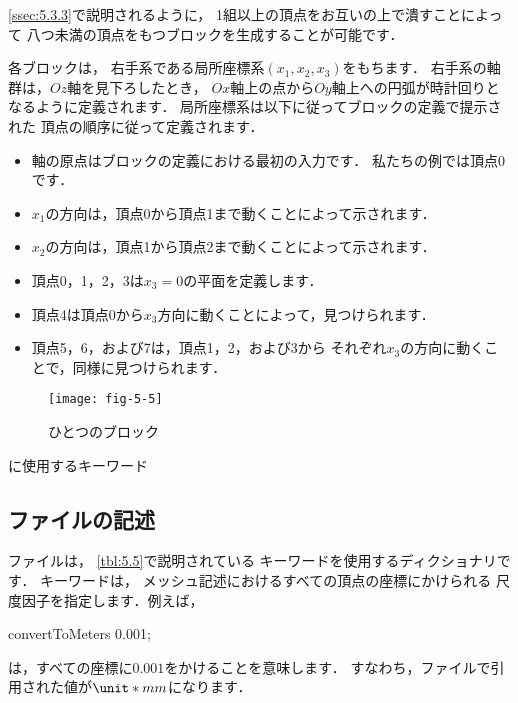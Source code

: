 \autoref{ssec:5.3.3}で説明されるように，
1組以上の頂点をお互いの上で潰すことによって
八つ未満の頂点をもつブロックを生成することが可能です．

各ブロックは，
右手系である局所座標系$(x_{1}, x_{2}, x_{3})$をもちます．
右手系の軸群は，$Oz$軸を見下ろしたとき，
$Ox$軸上の点から$Oy$軸上への円弧が時計回りとなるように定義されます．
局所座標系は以下に従ってブロックの定義で提示された
頂点の順序に従って定義されます．
\begin{itemize}
 \label{p:U-130}
 \item 軸の原点はブロックの定義における最初の入力です．
       私たちの例では頂点0です．
 \item $x_{1}$の方向は，頂点0から頂点1まで動くことによって示されます．
 \item $x_{2}$の方向は，頂点1から頂点2まで動くことによって示されます．
 \item 頂点0，1，2，3は$x_{3} = 0$の平面を定義します．
 \item 頂点4は頂点0から$x_{3}$方向に動くことによって，見つけられます．
 \item 頂点5，6，および7は，頂点1，2，および3から
       それぞれ$x_{3}$の方向に動くことで，同様に見つけられます．
\end{itemize}


\begin{figure}[ht]
 \texttt{[image: fig-5-5]}
 \caption{ひとつのブロック}
 \label{fig:5.5}
\end{figure}


\begin{table}[ht]
 
 \caption{に使用するキーワード}
 \label{tbl:5.5}
\end{table}


\subsection{ファイルの記述}
\label{ssec:5.3.1}
ファイルは，
\autoref{tbl:5.5}で説明されている
キーワードを使用するディクショナリです．
キーワードは，
メッシュ記述におけるすべての頂点の座標にかけられる
尺度因子を指定します．例えば，
\begin{OFverbatim}[file]
convertToMeters 0.001;
\end{OFverbatim}
は，すべての座標に$0.001$をかけることを意味します．
すなわち，ファイルで引用された値が$\unit*{mm}$になります．

